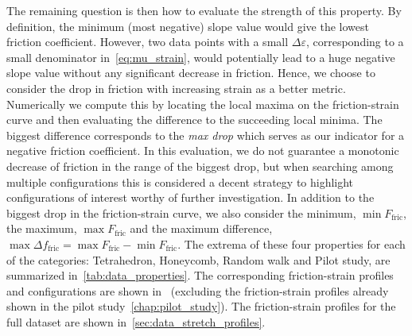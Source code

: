\noindent The remaining question is then how to evaluate the
strength of this property. By definition, the minimum (most negative) slope
value would give the lowest friction coefficient. However, two data points with
a small $\Delta \varepsilon$, corresponding to a small denominator
in~\cref{eq:mu_strain}, would potentially lead to a huge negative slope value
without any significant decrease in friction. Hence, we choose to consider the
drop in friction with increasing strain as a better metric. Numerically we
compute this by locating the local maxima on the friction-strain curve and then
evaluating the difference to the succeeding local minima. The biggest difference
corresponds to the \textit{max drop} which serves as our indicator for a
negative friction coefficient. In this evaluation, we do not guarantee a
monotonic decrease of friction in the range of the biggest drop, but when
searching among multiple configurations this is considered a decent strategy to
highlight configurations of interest worthy of further investigation. In
addition to the biggest drop in the friction-strain curve, we also consider the minimum, $\min
F_{\text{fric}}$, the maximum, $\max F_{\text{fric}}$ and the
maximum difference, $\max \Delta f_{\text{fric}} = \max F_{\text{fric}} - \min
F_{\text{fric}}$. The extrema of these four properties for each of the
categories: Tetrahedron, Honeycomb, Random walk and Pilot study, are summarized
in~\cref{tab:data_properties}. The corresponding friction-strain profiles and
configurations are shown in~ (excluding
the friction-strain profiles already shown in the pilot study~\cref{chap:pilot_study}). The friction-strain profiles for the full dataset are shown in~\ref{sec:data_stretch_profiles}. 



